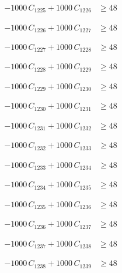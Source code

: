 \documentclass[a4paper,11pt]{article}
\begin{document}
\begin{align}
-1000\,C_{1225} + 1000\,C_{1226} &\geq 48 \nonumber
\end{align}

\begin{align}
-1000\,C_{1226} + 1000\,C_{1227} &\geq 48 \nonumber
\end{align}

\begin{align}
-1000\,C_{1227} + 1000\,C_{1228} &\geq 48 \nonumber
\end{align}

\begin{align}
-1000\,C_{1228} + 1000\,C_{1229} &\geq 48 \nonumber
\end{align}

\begin{align}
-1000\,C_{1229} + 1000\,C_{1230} &\geq 48 \nonumber
\end{align}

\begin{align}
-1000\,C_{1230} + 1000\,C_{1231} &\geq 48 \nonumber
\end{align}

\begin{align}
-1000\,C_{1231} + 1000\,C_{1232} &\geq 48 \nonumber
\end{align}

\begin{align}
-1000\,C_{1232} + 1000\,C_{1233} &\geq 48 \nonumber
\end{align}

\begin{align}
-1000\,C_{1233} + 1000\,C_{1234} &\geq 48 \nonumber
\end{align}

\begin{align}
-1000\,C_{1234} + 1000\,C_{1235} &\geq 48 \nonumber
\end{align}

\begin{align}
-1000\,C_{1235} + 1000\,C_{1236} &\geq 48 \nonumber
\end{align}

\begin{align}
-1000\,C_{1236} + 1000\,C_{1237} &\geq 48 \nonumber
\end{align}

\begin{align}
-1000\,C_{1237} + 1000\,C_{1238} &\geq 48 \nonumber
\end{align}

\begin{align}
-1000\,C_{1238} + 1000\,C_{1239} &\geq 48 \nonumber
\end{align}
\end{document}
